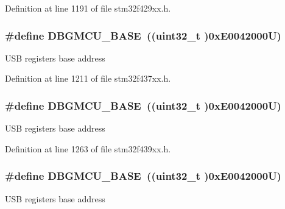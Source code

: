 Definition at line 1191 of file stm32f429xx.\+h.

\subsubsection[{\texorpdfstring{D\+B\+G\+M\+C\+U\+\_\+\+B\+A\+SE}{DBGMCU_BASE}}]{\setlength{\rightskip}{0pt plus 5cm}\#define D\+B\+G\+M\+C\+U\+\_\+\+B\+A\+SE~((uint32\+\_\+t )0x\+E0042000\+U)}\hypertarget{group___peripheral__memory__map_ga4adaf4fd82ccc3a538f1f27a70cdbbef}{}\label{group___peripheral__memory__map_ga4adaf4fd82ccc3a538f1f27a70cdbbef}
U\+SB registers base address 

Definition at line 1211 of file stm32f437xx.\+h.

\subsubsection[{\texorpdfstring{D\+B\+G\+M\+C\+U\+\_\+\+B\+A\+SE}{DBGMCU_BASE}}]{\setlength{\rightskip}{0pt plus 5cm}\#define D\+B\+G\+M\+C\+U\+\_\+\+B\+A\+SE~((uint32\+\_\+t )0x\+E0042000\+U)}\hypertarget{group___peripheral__memory__map_ga4adaf4fd82ccc3a538f1f27a70cdbbef}{}\label{group___peripheral__memory__map_ga4adaf4fd82ccc3a538f1f27a70cdbbef}
U\+SB registers base address 

Definition at line 1263 of file stm32f439xx.\+h.

\subsubsection[{\texorpdfstring{D\+B\+G\+M\+C\+U\+\_\+\+B\+A\+SE}{DBGMCU_BASE}}]{\setlength{\rightskip}{0pt plus 5cm}\#define D\+B\+G\+M\+C\+U\+\_\+\+B\+A\+SE~((uint32\+\_\+t )0x\+E0042000\+U)}\hypertarget{group___peripheral__memory__map_ga4adaf4fd82ccc3a538f1f27a70cdbbef}{}\label{group___peripheral__memory__map_ga4adaf4fd82ccc3a538f1f27a70cdbbef}
U\+SB registers base address 


